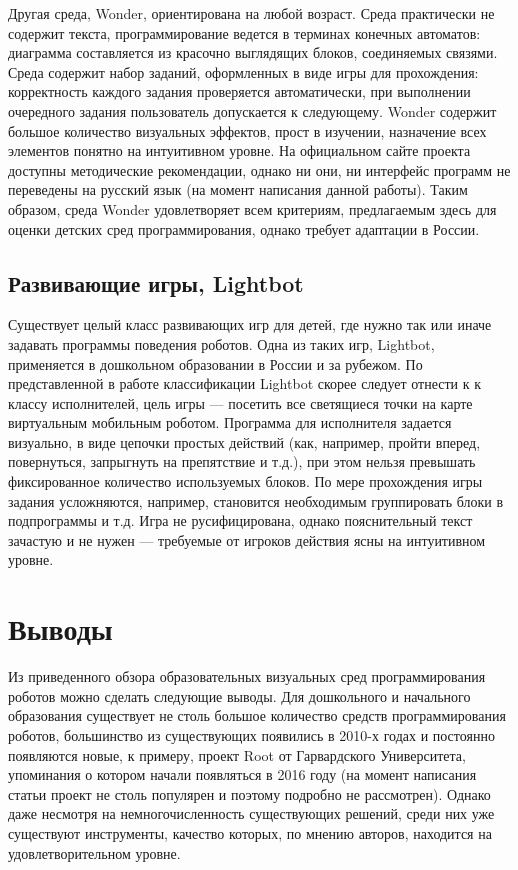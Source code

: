 \documentclass[a5paper]{article}
\begin{document}
Другая среда, Wonder, ориентирована на любой возраст. Среда практически не содержит текста, программирование 
ведется в терминах конечных автоматов: диаграмма составляется из красочно выглядящих блоков, соединяемых связями. 
Среда содержит набор заданий, оформленных в виде игры для прохождения: корректность каждого задания проверяется 
автоматически, при выполнении очередного задания пользователь допускается к следующему. Wonder содержит большое 
количество визуальных эффектов, прост в изучении, назначение всех элементов понятно на интуитивном уровне. На 
официальном сайте проекта доступны методические рекомендации, однако ни они, ни интерфейс программ не переведены 
на русский язык (на момент написания данной работы). Таким образом, среда Wonder удовлетворяет всем критериям, 
предлагаемым здесь для оценки детских сред программирования, однако требует адаптации в России.

\subsection{Развивающие игры, Lightbot}

Существует целый класс развивающих игр для детей, где нужно так или иначе задавать программы поведения роботов. 
Одна из таких игр, Lightbot, применяется в дошкольном образовании в России и за рубежом. По представленной в 
работе классификации Lightbot скорее следует отнести к к классу исполнителей, цель игры --- посетить все 
светящиеся точки на карте виртуальным мобильным роботом. Программа для исполнителя задается визуально, в виде 
цепочки простых действий (как, например, пройти вперед, повернуться, запрыгнуть на препятствие и т.д.), при 
этом нельзя превышать фиксированное количество используемых блоков. По мере прохождения игры задания усложняются, 
например, становится необходимым группировать блоки в подпрограммы и т.д. Игра не русифицирована, однако 
пояснительный текст зачастую и не нужен --- требуемые от игроков действия ясны на интуитивном уровне.

\section{Выводы}

Из приведенного обзора образовательных визуальных сред программирования роботов можно сделать следующие выводы. 
Для дошкольного и начального образования существует не столь большое количество средств программирования роботов, 
большинство из существующих появились в 2010-х годах и постоянно появляются новые, к примеру, проект Root от 
Гарвардского Университета, упоминания о котором начали появляться в 2016 году (на момент написания статьи проект 
не столь популярен и поэтому подробно не рассмотрен). Однако даже несмотря на немногочисленность существующих 
решений, среди них уже существуют инструменты, качество которых, по мнению авторов, находится на удовлетворительном 
уровне. 
\end{document}
